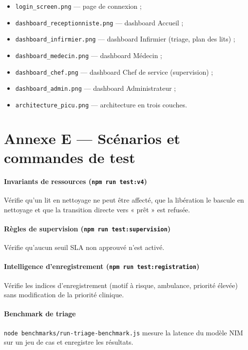 \begin{itemize}
    \item \texttt{login\_screen.png} — page de connexion ;
    \item \texttt{dashboard\_receptionniste.png} — dashboard Accueil ;
    \item \texttt{dashboard\_infirmier.png} — dashboard Infirmier (triage, plan des lits) ;
    \item \texttt{dashboard\_medecin.png} — dashboard Médecin ;
    \item \texttt{dashboard\_chef.png} — dashboard Chef de service (supervision) ;
    \item \texttt{dashboard\_admin.png} — dashboard Administrateur ;
    \item \texttt{architecture\_picu.png} — architecture en trois couches.
\end{itemize}

\section{Annexe E — Scénarios et commandes de test}

\paragraph{Invariants de ressources (\texttt{npm run test:v4})}
Vérifie qu'un lit en nettoyage ne peut être affecté, que la libération le bascule en nettoyage et que la transition directe vers « prêt » est refusée.

\paragraph{Règles de supervision (\texttt{npm run test:supervision})}
Vérifie qu'aucun seuil SLA non approuvé n'est activé.

\paragraph{Intelligence d'enregistrement (\texttt{npm run test:registration})}
Vérifie les indices d'enregistrement (motif à risque, ambulance, priorité élevée) sans modification de la priorité clinique.

\paragraph{Benchmark de triage}
\texttt{node benchmarks/run-triage-benchmark.js} mesure la latence du modèle NIM sur un jeu de cas et enregistre les résultats.

